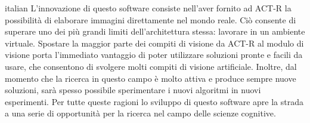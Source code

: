 \begin{otherlanguage*}{italian}
		L'innovazione di questo software consiste nell'aver fornito ad \mbox{ACT-R} la possibilità di elaborare immagini direttamente nel mondo reale.
		Ciò consente di superare uno dei più grandi limiti dell'architettura stessa: lavorare in un ambiente virtuale.
		Spostare la maggior parte dei compiti di visione da \mbox{ACT-R} al modulo di visione porta l'immediato vantaggio di poter utilizzare soluzioni pronte e facili da usare, che consentono di svolgere molti compiti di visione artificiale.
		Inoltre, dal momento che la ricerca in questo campo è molto attiva e produce sempre nuove soluzioni, sarà spesso possibile sperimentare i nuovi algoritmi in nuovi esperimenti.
		Per tutte queste ragioni lo sviluppo di questo software apre la strada a una serie di opportunità per la ricerca nel campo delle scienze cognitive.
	

 
		
\end{otherlanguage*}




